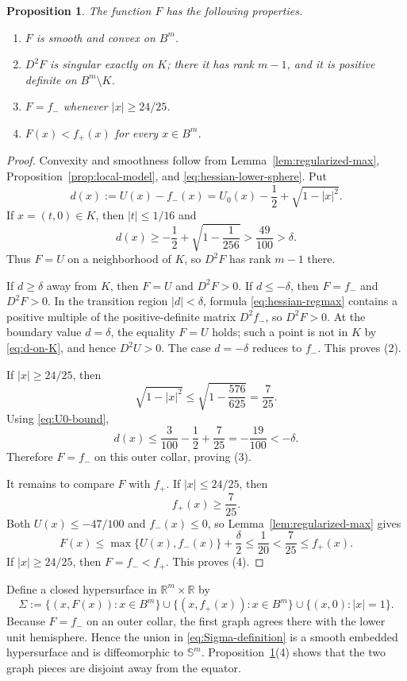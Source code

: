 \documentclass[11pt]{amsart}
\newtheorem{proposition}[theorem]{Proposition}
\theoremstyle{remark}
\newcommand{\R}{\mathbb R}
\newcommand{\Sph}{\mathbb S}
\begin{document}
\begin{proposition}\label{prop:global-graph}
The function $F$ has the following properties.
\begin{enumerate}[label=\textup{(\arabic*)},leftmargin=2.2em]
 \item $F$ is smooth and convex on $B^m$.
 \item $D^2F$ is singular exactly on $K$; there it has rank $m-1$, and it is positive definite on $B^m\setminus K$.
 \item $F=f_-$ whenever $|x|\geq24/25$.
 \item $F(x)<f_+(x)$ for every $x\in B^m$.
\end{enumerate}
\end{proposition}

\begin{proof}
Convexity and smoothness follow from Lemma~\ref{lem:regularized-max}, Proposition~\ref{prop:local-model}, and \eqref{eq:hessian-lower-sphere}.  Put
\[
 d(x):=U(x)-f_-(x)
 =U_0(x)-\frac12+\sqrt{1-|x|^2}.
\]
If $x=(t,0)\in K$, then $|t|\leq1/16$ and
\begin{equation}\label{eq:d-on-K}
 d(x)\geq-\frac12+\sqrt{1-\frac1{256}}
 >\frac{49}{100}>\delta.
\end{equation}
Thus $F=U$ on a neighborhood of $K$, so $D^2F$ has rank $m-1$ there.

If $d\geq\delta$ away from $K$, then $F=U$ and $D^2F>0$.  If $d\leq-\delta$, then $F=f_-$ and $D^2F>0$.  In the transition region $|d|<\delta$, formula \eqref{eq:hessian-regmax} contains a positive multiple of the positive-definite matrix $D^2f_-$, so $D^2F>0$.  At the boundary value $d=\delta$, the equality $F=U$ holds; such a point is not in $K$ by \eqref{eq:d-on-K}, and hence $D^2U>0$.  The case $d=-\delta$ reduces to $f_-$.  This proves (2).

If $|x|\geq24/25$, then
\[
 \sqrt{1-|x|^2}\leq\sqrt{1-\frac{576}{625}}
 =\frac7{25}.
\]
Using \eqref{eq:U0-bound},
\[
 d(x)\leq\frac3{100}-\frac12+\frac7{25}
 =-\frac{19}{100}< -\delta.
\]
Therefore $F=f_-$ on this outer collar, proving (3).

It remains to compare $F$ with $f_+$.  If $|x|\leq24/25$, then
\[
 f_+(x)\geq\frac7{25}.
\]
Both $U(x)\leq-47/100$ and $f_-(x)\leq0$, so Lemma~\ref{lem:regularized-max} gives
\[
 F(x)\leq\max\{U(x),f_-(x)\}+\frac\delta2
 \leq\frac1{20}<\frac7{25}\leq f_+(x).
\]
If $|x|\geq24/25$, then $F=f_-<f_+$.  This proves (4).
\end{proof}

Define a closed hypersurface in $\R^m\times\R$ by
\begin{equation}\label{eq:Sigma-definition}
 \Sigma
 :=\{(x,F(x)):x\in B^m\}
 \cup\{(x,f_+(x)):x\in B^m\}
 \cup\{(x,0):|x|=1\}.
\end{equation}
Because $F=f_-$ on an outer collar, the first graph agrees there with the lower unit hemisphere.  Hence the union in \eqref{eq:Sigma-definition} is a smooth embedded hypersurface and is diffeomorphic to $\Sph^m$.  Proposition~\ref{prop:global-graph}(4) shows that the two graph pieces are disjoint away from the equator.
\end{document}
